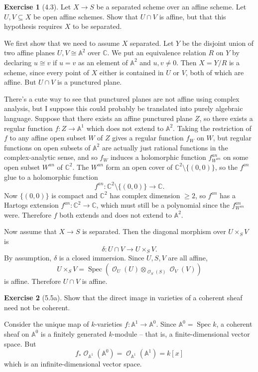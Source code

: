 \documentclass[10pt]{article}
\newcommand{\CC}{\mathbb{C}}
\newcommand{\Aff}{\mathbb A}
\newcommand{\Spec}{\operatorname{Spec}}
\DeclareMathOperator{\Olo}{\mathscr O}
\theoremstyle{definition}
\newtheorem{exer}{Exercise}
\begin{document}
\begin{exer}[4.3]
Let $X \to S$ be a separated scheme over an affine scheme.
Let $U, V \subseteq X$ be open affine schemes.
Show that $U \cap V$ is affine, but that this hypothesis requires $X$ to be separated.
\end{exer}

We first show that we need to assume $X$ separated.
Let $Y$ be the disjoint union of two affine planes $U, V \cong \Aff^2$ over $\CC$.
We put an equivalence relation $R$ on $Y$ by declaring $u \cong v$ if $u = v$ as an element of $\Aff^2$ and $u,v \neq 0$.
Then $X = Y/R$ is a scheme, since every point of $X$ either is contained in $U$ or $V$, both of which are affine.
But $U \cap V$ is a punctured plane.

There's a cute way to see that punctured planes are not affine using complex analysis, but I suppose this could probably be translated into purely algebraic language.
Suppose that there exists an affine punctured plane $Z$, so there exists a regular function $f: Z \to \Aff^1$ which does not extend to $\Aff^2$.
Taking the restriction of $f$ to any affine open subset $W$ of $Z$ gives a regular function $f_W$ on $W$, but regular functions on open subsets of $\Aff^2$ are actually just rational functions in the complex-analytic sense, and so $f_W$ induces a holomorphic function $f^{an}_{W^{an}}$ on some open subset $W^{an}$ of $\CC^2$.
The $W^{an}$ form an open cover of $\CC^2 \setminus \{(0, 0)\}$, so the $f^{an}$ glue to a holomorphic function
$$f^{an}: \CC^2 \setminus \{(0, 0)\} \to \CC.$$
Now $\{(0, 0)\}$ is compact and $\CC^2$ has complex dimension $\geq 2$, so $f^{an}$ has a Hartogs extension $f^{an}: \CC^2 \to \CC$, which must still be a polynomial since the $f^{an}_{W^{an}}$ were.
Therefore $f$ both extends and does not extend to $\Aff^2$.

Now assume that $X \to S$ is separated.
Then the diagonal morphism over $U \times_S V$ is
$$\delta: U \cap V \to U \times_S V.$$
By assumption, $\delta$ is a closed immersion. Since $U,S,V$ are all affine,
$$U \times_S V = \Spec(\Olo_U(U) \otimes_{\Olo_S(S)} \Olo_V(V))$$
is affine. Therefore $U \cap V$ is affine.

\begin{exer}[5.5a]
Show that the direct image in varieties of a coherent sheaf need not be coherent.
\end{exer}

Consider the unique map of $k$-varieties $f: \Aff^1 \to \Aff^0$.
Since $\Aff^0 = \Spec k$, a coherent sheaf on $\Aff^0$ is a finitely generated $k$-module -- that is, a finite-dimensional vector space.
But
$$f_* \Olo_{\Aff^1}(\Aff^0) = \Olo_{\Aff^1}(\Aff^1) = k[x]$$
which is an infinite-dimensional vector space.
\end{document}
